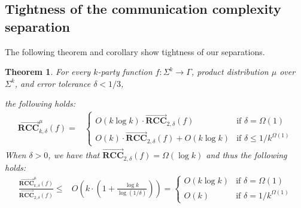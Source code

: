 \documentclass[11pt]{article}
\numberwithin{equation}{section}
\newtheorem{theorem}{Theorem}[section]
\theoremstyle{definition}
\theoremstyle{plain}
\newcommand{\error}{\ensuremath{\delta}}
\newcommand{\bigo}[1]{\ensuremath{{{O} \left( {#1} \right)}}}
\newcommand{\bigomega}[1]{\ensuremath{{\Omega \left( {#1} \right)}}}
\newcommand{\alphabet}{\ensuremath{\Sigma}}
\newcommand{\range}{\ensuremath{\Gamma}}
\newcommand{\rccone}{\ensuremath{\overrightarrow{\mathbf{RCC}}}}
\begin{document}
\subsection{Tightness of the communication complexity separation}

The following theorem and corollary show tightness of our separations.



\begin{theorem}\label{theorem:logk-tight}
For every $k$-party function $f: \alphabet^k\to \range$, product distribution $\mu$ over $\alphabet^k$, and error tolerance $\error <1/3$, 

the following holds:
\begin{align*}
\rccone_{k,\error}^{\mu}(f) =& \begin{cases}
	\bigo{k\log k}	 \cdot  \rccone_{2,\error}(f) & \mbox{if $\error={\bigomega{1}}$}\\
	\bigo{k}	 \cdot  \rccone_{2,\error}(f)+\bigo{k\log k}	& \mbox{if $\error \le 1/k^{\bigomega{1}} $}
\end{cases}  
\end{align*}
When $\delta > 0$, we have that $\rccone_{2,\error}(f) = \Omega(\log k)$ and thus the following holds:
\begin{align*}
\frac{{\rccone_{k,\error}^{\mu}(f)}} {{\rccone_{2,\error}(f)}} \le & 
\bigo{k \cdot \left(1+\frac{\log k}{\log(1/\error)}\right) }
= \begin{cases}
	\bigo{k\log k}	  & \mbox{if $\error={\bigomega{1}}$}\\
	\bigo{k}		& \mbox{if $\error=1/k^{\bigomega{1}}$}
	\end{cases}
\end{align*}


\end{theorem}
\end{document}
